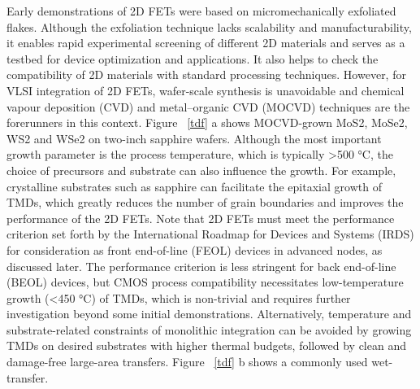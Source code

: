 \documentclass[12pt,a4paper]{report}
\begin{document}
\begin{itemize}
  Early demonstrations of 2D FETs were based on micromechanically exfoliated flakes. Although the exfoliation technique lacks scalability and manufacturability, it enables rapid experimental screening of different 2D materials and serves as a testbed for device optimization and applications. It also helps to check the compatibility of 2D materials with standard processing techniques. However, for VLSI integration of 2D FETs, wafer-scale synthesis is unavoidable and chemical vapour deposition (CVD) and metal–organic CVD (MOCVD) techniques are the forerunners in this context. Figure ~\ref{tdf} a shows MOCVD-grown MoS2, MoSe2, WS2 and WSe2 on two-inch sapphire wafers. Although the most important growth parameter is the process temperature, which is typically >500 °C, the choice of precursors and substrate can also influence the growth. For example, crystalline substrates such as sapphire can facilitate the epitaxial growth of TMDs, which greatly reduces the number of grain boundaries and improves the performance of the 2D FETs. Note that 2D FETs must meet the performance criterion set forth by the International Roadmap for Devices and Systems (IRDS) for consideration as front end-of-line (FEOL) devices in advanced nodes, as discussed later. The performance criterion is less stringent for back end-of-line (BEOL) devices, but CMOS process compatibility necessitates low-temperature growth (<450 °C) of TMDs, which is non-trivial and requires further investigation beyond some initial demonstrations. Alternatively, temperature and substrate-related constraints of monolithic integration can be avoided by growing TMDs on desired substrates with higher thermal budgets, followed by clean and damage-free large-area transfers. Figure ~\ref{tdf} b shows a commonly used wet-transfer.


\end{itemize}
\end{document}
